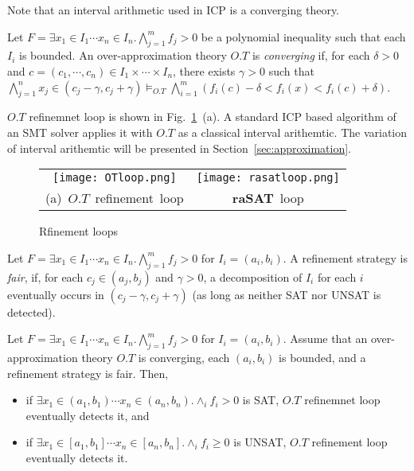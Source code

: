 Note that an interval arithmetic used in ICP is a converging theory. 

\begin{definition} \label{def:completeOT}
Let
$F = \exists x_1 \in I_1 \cdots x_n \in I_n. \bigwedge \limits_{j=1}^m f_j > 0$
be a polynomial inequality such that each $I_i$ is bounded. 
An over-approximation theory $O.T$ is {\em converging} 
if, for each $\delta > 0$ and $c = (c_1, \cdots, c_n) \in I_1 \times \cdots \times I_n$, 
there exists $\gamma > 0$ such that 
$\bigwedge \limits_{j=1}^n x_j \in (c_j - \gamma, c_j + \gamma) \models_{O.T} 
 \bigwedge \limits_{i=1}^m (f_i(c) - \delta < f_i(x) < f_i(c) + \delta)$. 
\end{definition}

$O.T$ refinemnet loop is shown in Fig.~\ref{fig:OTrefine}~(a). 
A standard ICP based algorithm of an SMT solver applies it with $O.T$ as a classical interval arithemtic. 
The variation of interval arithemtic will be presented in Section~\ref{sec:approximation}. 
\begin{figure}[ht]
\begin{minipage}[b]{1.0\linewidth}
\centering
\begin{tabular}{c@{\qquad}c}
\texttt{[image: OTloop.png]} & 
\texttt{[image: rasatloop.png]} \\   
\mbox{(a) $O.T$ refinement loop} & \mbox{{\bf raSAT} loop} \\
\end{tabular}
\end{minipage} 
\caption{Rfinement loops} 
\label{fig:OTrefine} 
\end{figure}


\begin{definition} 
Let
$F = \exists x_1 \in I_1 \cdots x_n \in I_n. \bigwedge \limits_{j=1}^m f_j > 0$
for $I_i = (a_i,b_i)$.
A refinement strategy is {\em fair}, if, for each $c_j \in (a_j,b_j)$ and $\gamma > 0$, 
a decomposition of $I_i$ for each $i$ eventually occurs in $(c_j - \gamma, c_j + \gamma)$ 
(as long as neither SAT nor UNSAT is detected). 
\end{definition}

\begin{theorem} \label{th:RelComp}
Let
$F = \exists x_1 \in I_1 \cdots x_n \in I_n. \bigwedge \limits_{j=1}^m f_j > 0$
for $I_i = (a_i,b_i)$.
Assume that an over-approximation theory $O.T$ is converging, 
each $(a_i,b_i)$ is bounded, and a refinement strategy is fair. 
Then, 
\begin{itemize}
\item if $\exists x_1 \in (a_1,b_1) \cdots x_n \in (a_n,b_n) . \wedge_{i} f_i > 0$ is SAT, 
$O.T$ refinemnet loop eventually detects it, and
\item if $\exists x_1 \in [a_1,b_1] \cdots x_n \in [a_n,b_n] . \wedge_{i} f_i \geq 0$ is UNSAT, 
$O.T$ refinement loop eventually detects it.  
\end{itemize}
\end{theorem}


